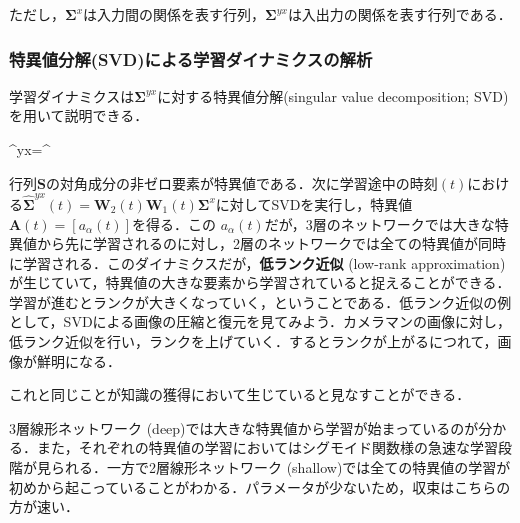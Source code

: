 ただし，$ \mathbf{\Sigma}^{x}$は入力間の関係を表す行列，$\mathbf{\Sigma}^{yx}$は入出力の関係を表す行列である．

\subsubsection{特異値分解(SVD)による学習ダイナミクスの解析}
学習ダイナミクスは$ \mathbf{\Sigma}^{yx}$に対する特異値分解(singular value decomposition; SVD)を用いて説明できる．


\mathbf{\Sigma}^{yx}=^\top


行列$ \mathbf{ S}$の対角成分の非ゼロ要素が特異値である．次に学習途中の時刻$(t)$における$\hat{\mathbf{\Sigma}}^{yx}(t)=\mathbf{W}_2 (t) \mathbf{W}_1(t) \mathbf{\Sigma}^{x}$に対してSVDを実行し，特異値$\mathbf{A}(t)=[a_{\alpha}(t)]$を得る．この $a _ {\alpha}(t)$だが，3層のネットワークでは大きな特異値から先に学習されるのに対し，2層のネットワークでは全ての特異値が同時に学習される．このダイナミクスだが，\textbf{低ランク近似} (low-rank approximation)が生じていて，特異値の大きな要素から学習されていると捉えることができる．学習が進むとランクが大きくなっていく，ということである．低ランク近似の例として，SVDによる画像の圧縮と復元を見てみよう．カメラマンの画像に対し，低ランク近似を行い，ランクを上げていく．するとランクが上がるにつれて，画像が鮮明になる．





これと同じことが知識の獲得において生じていると見なすことができる．





3層線形ネットワーク (deep)では大きな特異値から学習が始まっているのが分かる．また，それぞれの特異値の学習においてはシグモイド関数様の急速な学習段階が見られる．一方で2層線形ネットワーク (shallow)では全ての特異値の学習が初めから起こっていることがわかる．パラメータが少ないため，収束はこちらの方が速い．

